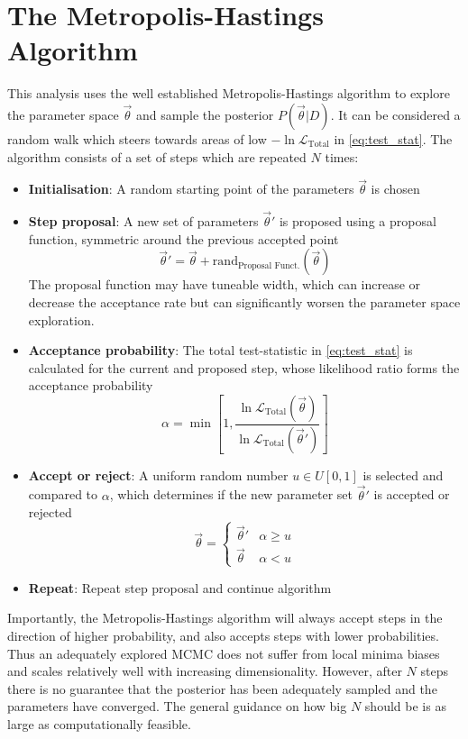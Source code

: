 \section{The Metropolis-Hastings Algorithm}
This analysis uses the well established Metropolis-Hastings algorithm\cite{metropolis,hastings} to explore the parameter space $\vec{\theta}$ and sample the posterior $P(\vec{\theta}|D)$. It can be considered a random walk which steers towards areas of low $-\ln\mathcal{L}_\text{Total}$ in \autoref{eq:test_stat}. The algorithm consists of a set of steps which are repeated $N$ times:
\begin{itemize}
	\item \textbf{Initialisation}: A random starting point of the parameters $\vec{\theta}$ is chosen
	\item \textbf{Step proposal}: A new set of parameters $\vec{\theta}'$ is proposed using a proposal function, symmetric around the previous accepted point
	\begin{equation}
		\vec{\theta}' = \vec{\theta}+\text{rand}_{\text{Proposal Funct.}}(\vec{\theta})
	\end{equation}
	The proposal function may have tuneable width, which can increase or decrease the acceptance rate but can significantly worsen the parameter space exploration.
	\item \textbf{Acceptance probability}: The total test-statistic in \autoref{eq:test_stat} is calculated for the current and proposed step, whose likelihood ratio forms the acceptance probability
	\begin{equation}
		\alpha = \min \left[ 1,
		\frac{\ln\mathcal{L}_\text{Total}(\vec{\theta})}{ \ln\mathcal{L}_\text{Total}(\vec{\theta}')}\right]
	\end{equation}
	\item \textbf{Accept or reject}: A uniform random number $u \in U[0,1]$ is selected and compared to $\alpha$, which determines if the new parameter set $\vec{\theta}'$ is accepted or rejected
	\begin{equation}
	\vec{\theta} =
	\begin{cases}
		\vec{\theta}' & \alpha \ge u \\
		\vec{\theta} & \alpha < u
	\end{cases}
	\end{equation}
	\item \textbf{Repeat}: Repeat step proposal and continue algorithm
\end{itemize}
Importantly, the Metropolis-Hastings algorithm will always accept steps in the direction of higher probability, and also accepts steps with lower probabilities. Thus an adequately explored MCMC does not suffer from local minima biases and scales relatively well with increasing dimensionality. However, after $N$ steps there is no guarantee that the posterior has been adequately sampled and the parameters have converged. The general guidance on how big $N$ should be is as large as computationally feasible\cite{mcmc_handbook}.

